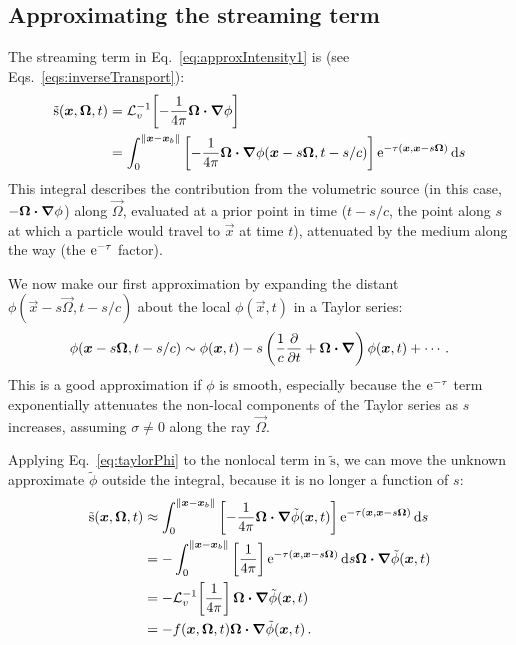 \subsection{Approximating the streaming term}
The streaming term in Eq.~\eqref{eq:approxIntensity1} is (see
Eqs.~\eqref{eqs:inverseTransport}):
\begin{align*}
  \mathrm{ \tilde s }(\bm{x}, \bm{\Omega}, t) &=
    \mathcal{L}_{v}^{-1}\!\left[ -\frac1{4\pi}\bm{\Omega}\bm{\cdot} \bm{\nabla} \phi \right]
  \\
  &= \int_{0}^{\left\| \bm{x} - \bm{x}_b \right\|}
    \left[ -\frac1{4\pi}\bm{\Omega}\bm{\cdot} \bm{\nabla} \phi(\bm{x} - s \bm{\Omega},
    t-s/c)
    \right]
    \mathop{}\!\mathrm{e}^{ -\tau(\bm{x}, \bm{x} - s \bm{\Omega})}
    \mathop{}\!\mathrm{d} s
\end{align*}
This integral describes the contribution from the volumetric source (in this
case, $-\bm{\Omega}\bm{\cdot}\bm{\nabla}\phi$) along $\vec{\Omega}$, evaluated at a prior
point in time ($t-s/c$, the point along $s$ at which a particle would travel
to $\vec{x}$ at time $t$), attenuated by the medium along the way (the
$\mathop{}\!\mathrm{e}^{ -\tau }$ factor).

We now make our first approximation by expanding the distant $\phi(\vec{x} - s
\vec{\Omega}, t-s/c)$ about the local $\phi(\vec{x}, t)$ in a Taylor series:
\begin{equation} \label{eq:taylorPhi}
  \phi(\bm{x} - s \bm{\Omega}, t-s/c)
  \sim \phi(\bm{x},t) - s \left( \frac{1}{c} \frac{\partial }{\partial t} + \bm{\Omega} \bm{\cdot}
  \bm{\nabla}  \right) \phi (\bm{x}, t) + \cdots \,.
\end{equation}
This is a good approximation if $\phi$ is smooth, especially because the
$\mathop{}\!\mathrm{e}^{ -\tau }$ term exponentially attenuates the non-local components of the
Taylor series as $s$ increases, assuming $\sigma\ne 0$ along the ray
$\vec{\Omega}$.

Applying Eq.~\eqref{eq:taylorPhi} to the nonlocal term in $\mathrm{ \tilde s
}$, we can move the unknown approximate $\tilde \phi$ outside the integral,
because it is no longer a function of $s$:
\begin{align}\nonumber
  \mathrm{ \tilde s }(\bm{x}, \bm{\Omega}, t)
  &\approx \int_{0}^{\left\| \bm{x} - \bm{x}_b \right\|}
    \left[ -\frac1{4\pi}\bm{\Omega}\bm{\cdot} \bm{\nabla} \tilde\phi(\bm{x},t) \right]
    \mathop{}\!\mathrm{e}^{ -\tau(\bm{x}, \bm{x} - s \bm{\Omega})}
    \mathop{}\!\mathrm{d} s
  \\\nonumber
  &= - \int_{0}^{\left\| \bm{x} - \bm{x}_b \right\|}
    \left[ \frac1{4\pi}\right]
    \mathop{}\!\mathrm{e}^{ -\tau(\bm{x}, \bm{x} - s \bm{\Omega})} \mathop{}\!\mathrm{d} s
    \bm{\Omega}\bm{\cdot} \bm{\nabla} \tilde \phi(\bm{x},t)
  \\\nonumber
  &= - \mathcal{L}_{v}^{-1}\!\left[ \frac1{4\pi} \right] \bm{\Omega}\bm{\cdot} \bm{\nabla} \tilde \phi(\bm{x},t)
  \\\label{eq:tildeS}
  &= -f(\bm{x}, \bm{\Omega}, t) \bm{\Omega}\bm{\cdot} \bm{\nabla} \tilde \phi(\bm{x},t)
  \,.
\end{align}


